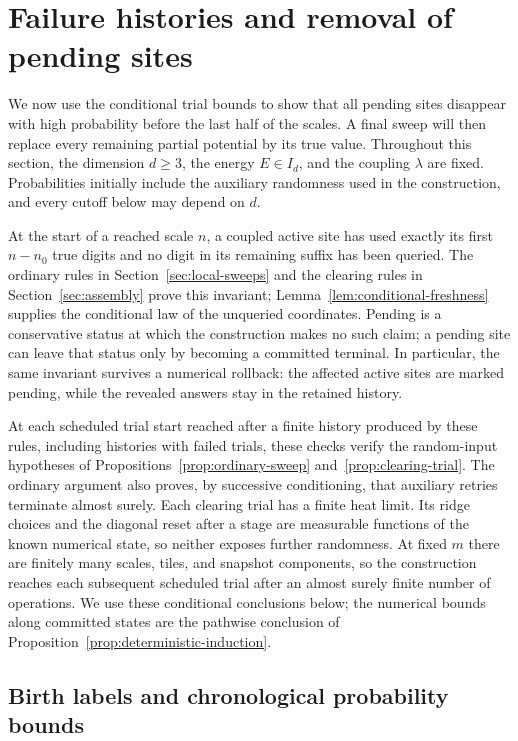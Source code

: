 \section{Failure histories and removal of pending sites}
\label{sec:history}

We now use the conditional trial bounds to show that all pending sites
disappear with high probability before the last half of the scales. A
final sweep will then replace every remaining partial potential by its
true value. Throughout this section, the dimension $d\ge3$, the energy
$E\in I_d$, and the coupling $\lambda$ are fixed. Probabilities initially
include the auxiliary randomness used in the construction, and every
cutoff below may depend on $d$.

At the start of a reached scale $n$, a coupled active site has used
exactly its first $n-n_0$ true digits and no digit in its remaining suffix
has been queried. The ordinary rules in Section~\ref{sec:local-sweeps}
and the clearing rules in Section~\ref{sec:assembly} prove this invariant;
Lemma~\ref{lem:conditional-freshness} supplies the conditional law of
the unqueried coordinates. Pending is a conservative status at which the
construction makes no such claim; a pending site can leave that status
only by becoming a committed terminal. In particular, the same invariant
survives a numerical rollback: the affected active sites are marked
pending, while the revealed answers stay in the retained history.

At each scheduled trial start reached after a finite history produced by
these rules, including histories with failed trials, these checks verify
the random-input hypotheses of Propositions~\ref{prop:ordinary-sweep}
and~\ref{prop:clearing-trial}. The ordinary argument also proves, by
successive conditioning, that auxiliary retries terminate almost surely.
Each clearing trial has a finite heat limit. Its ridge choices and the
diagonal reset after a stage are measurable functions of the known
numerical state, so neither exposes further randomness. At fixed $m$ there are finitely
many scales, tiles, and snapshot components, so the construction reaches each
subsequent scheduled trial after an almost surely finite number of
operations. We use these conditional conclusions below; the numerical
bounds along committed states are the pathwise conclusion of
Proposition~\ref{prop:deterministic-induction}.

\subsection{Birth labels and chronological probability bounds}

